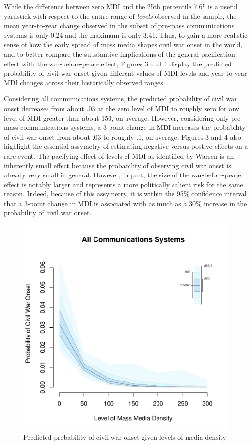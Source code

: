 \documentclass[11pt,article,oneside]{memoir}
\makeatletter
\def\maxwidth{\ifdim\Gin@nat@width>\linewidth\linewidth
\else\Gin@nat@width\fi}
\let\Oldincludegraphics\includegraphics
\renewcommand{\includegraphics}[1]{\Oldincludegraphics[width=\maxwidth]{#1}}
\makeatother
\begin{document}
While the difference between zero MDI and the 25th percentile 7.65 is a
useful yardstick with respect to the entire range of \emph{levels}
observed in the sample, the mean year-to-year change observed in the
subset of pre-mass communications systems is only 0.24 and the maximum
is only 3.41. Thus, to gain a more realistic sense of how the early
spread of mass media shapes civil war onset in the world, and to better
compare the substantive implications of the general pacification effect
with the war-before-peace effect, Figures 3 and 4 display the predicted
probability of civil war onset given different values of MDI levels and
year-to-year MDI changes across their historically observed ranges.

Considering all communications systems, the predicted probability of
civil war onset decreases from about .03 at the zero level of MDI to
roughly zero for any level of MDI greater than about 150, on average.
However, considering only pre-mass communications systems, a 3-point
change in MDI increases the probability of civil war onset from about
.03 to roughly .1, on average. Figures 3 and 4 also highlight the
essential assymetry of estimating negative versus postive effects on a
rare event. The pacifying effect of levels of MDI as identified by
Warren is an inherently small effect because the probability of
observing civil war onset is already very small in general. However, in
part, the size of the war-before-peace effect is notably larger and
represents a more politically salient risk for the same reason. Indeed,
because of this assymetry, it is within the 95\% confidence interval
that a 3-point change in MDI is associated with as much as a 30\%
increase in the probability of civil war onset.

\clearpage

\begin{figure} 
\includegraphics{figure/mdi_effect.pdf} 
\caption{Predicted probability of civil war onset given levels of media density} 
\label{myFigur} 
\end{figure}
\end{document}
